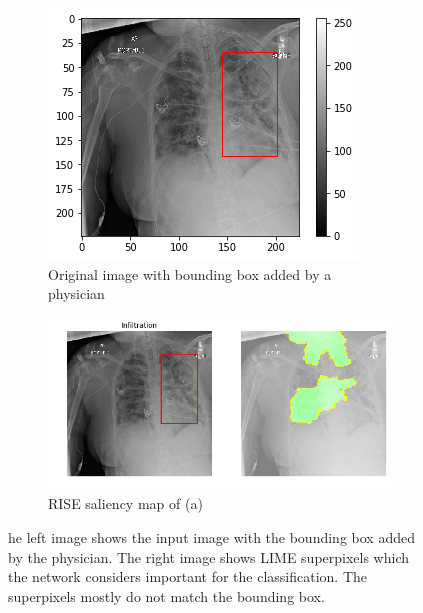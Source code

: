 \begin{figure}[H]
    \centering
    \begin{subfigure}[t]{.45\textwidth}
        \centering
        \includegraphics[width=\linewidth]{chapters/03_classification/images/rise2_bbox.png}
        \caption{Original image with bounding box added by a physician}
    \end{subfigure}\hspace{1cm}%
    \begin{subfigure}[t]{.45\textwidth}
        \centering
        \includegraphics[width=\linewidth]{chapters/03_classification/images/lime_8.png}
        \caption{RISE saliency map of (a)}
    \end{subfigure}
    \caption{he left image shows the input image with the bounding box added by the physician.  The right image  shows  LIME  superpixels  which  the  network considers  important  for  the  classification. The superpixels mostly do not match the bounding box.}
    \label{lime_example_3}
\end{figure}

